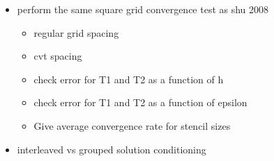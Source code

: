 \begin{itemize} 
    \item perform the same square grid convergence test as shu 2008
    \begin{itemize} 
        \item regular grid spacing
        \item cvt spacing
        \item check error for T1 and T2 as a function of h
        \item check error for T1 and T2 as a function of epsilon
        \item Give average convergence rate for stencil sizes
    \end{itemize} 
\item interleaved vs grouped solution conditioning
\end{itemize} 
